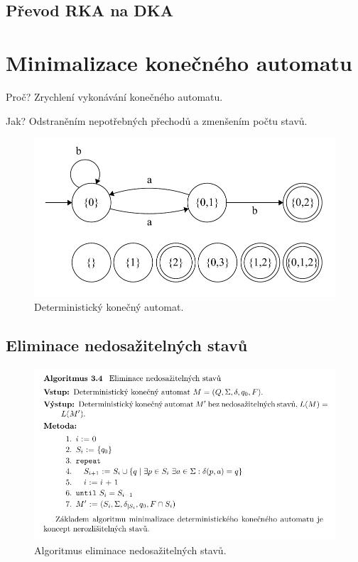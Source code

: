 \subsection{Převod RKA na DKA}



\section{Minimalizace konečného automatu}

\begin{compactitem}
    \item Proč? Zrychlení vykonávání konečného automatu.
    \item Jak? Odstraněním nepotřebných přechodů a zmenšením počtu stavů.
\end{compactitem}

\begin{figure}[H]
    \centering
    \includegraphics[width=0.75\linewidth]{dka_uplny.pdf}
    \caption{Deterministický konečný automat.}
\end{figure}

\subsection{Eliminace nedosažitelných stavů}

\begin{figure}[H]
    \centering
    \includegraphics[width=0.9\linewidth]{eliminace_nedosazitelnych_stavu.pdf}
    \caption{Algoritmus eliminace nedosažitelných stavů.}
\end{figure}


